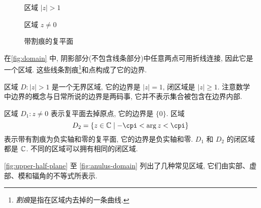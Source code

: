 \begin{figure}[!htb]
  \centering
  \begin{minipage}{.32\textwidth}
    \centering
    \caption{区域 $|z|>1$}
  \end{minipage}
  \begin{minipage}{.32\textwidth}
    \centering
    \caption{区域 $z\neq0$}
  \end{minipage}
  \begin{minipage}{.32\textwidth}
    \centering
    \caption{带割痕的复平面}
  \end{minipage}
\end{figure}

\begin{exampleenum}
  \item 在\ref{fig:domain} 中, 阴影部分(不包含线条部分)中任意两点可用折线连接, 因此它是一个区域.
  这些线条割痕\footnote{\emph{割痕}是指在区域内去掉的一条曲线.}和点构成了它的边界.
  \item 区域 $D:|z|>1$ 是一个无界区域, 它的边界是 $|z|=1$, 闭区域是 $|z|\ge 1$.
  注意数学中边界的概念与日常所说的边界是两码事, 它并不表示集合被包含在边界内部. 
  \item 区域 $D_1:z\neq 0$ 表示复平面去掉原点, 它的边界是 $\{0\}$.
  区域 
  \[
    D_2=\{z\in\BC\mid -\cpi<\arg z<\cpi\}
  \]
  表示带有割痕为负实轴和零的复平面, 它的边界是负实轴和零.
  $D_1$ 和 $D_2$ 的闭区域都是 ${\mathbb{C}}$.
  不同的区域可以拥有相同的闭区域.
  \item \ref{fig:upper-half-plane} 至 \ref{fig:anulus-domain} 列出了几种常见区域, 它们由实部、虚部、模和辐角的不等式所表示. 
\end{exampleenum}

